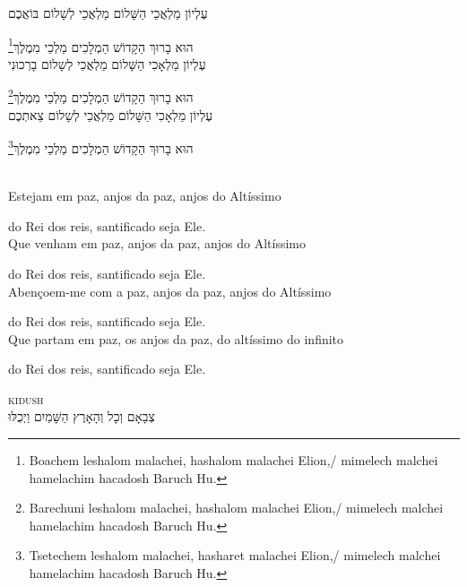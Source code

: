 עֶלְיוֹן מַלְאֲכֵי הַשָּׁלוֹם מַלְאֲכֵי לְשָׁלוֹם בּוֹאֲכֶם

הוּא בָרוּךְ הַקָדוֹשׁ הַמְלָכִים מַלְכֵי מִמֶלֶךְ\footnote{Boachem leshalom malachei, hashalom malachei Elion,/
mimelech malchei hamelachim hacadosh Baruch Hu.}\\[10pt]

עֶלְיוֹן מַלְאָכִי הַשָּׁלוֹם מַלְאֲכֵי לְשָלוֹם בָרְכוּנִי

הוּא בָרוּךְ הַקָדוֹשׁ הַמְלָכִים מַלְכֵי מִמֶלֶךְ\footnote{Barechuni leshalom malachei, hashalom malachei Elion,/
mimelech malchei hamelachim hacadosh Baruch Hu.}\\[10pt] 

עֶלְיוֹן מַלְאָכִי הַשָּׁלוֹם מַלְאֲכֵי לְשָלוֹם צֵאתְכֶם 

הוּא בָרוּךְ הַקָדוֹשׁ הַמְלָכִים מַלְכֵי מִמֶלֶךְ\footnote{Tsetechem leshalom malachei, hasharet malachei Elion,/
mimelech malchei hamelachim hacadosh Baruch Hu.} 


\movetooddpage
\raggedright

\vspace*{1cm}

\textsc{}\\[15pt]


Estejam em paz, anjos da paz, anjos do Altíssimo

do Rei dos reis, santificado seja Ele.\\[10pt]

Que venham em paz, anjos da paz, anjos do Altíssimo

do Rei dos reis, santificado seja Ele.\\[10pt]

Abençoem-me com a paz, anjos da paz, \qb{}anjos do Altíssimo

do Rei dos reis, santificado seja Ele.\\[10pt]

Que partam em paz, os anjos da paz, \qb{}do altíssimo do infinito

do Rei dos reis, santificado seja Ele.\\[10pt]


\movetoevenpage
\raggedleft


\vspace*{1cm}

\textsc{kidush}\\[15pt]

צְבָאָם וְכָל וְהָאָרֶץ הַשָּׁמַיִם וַיְכֻלּוּ 

